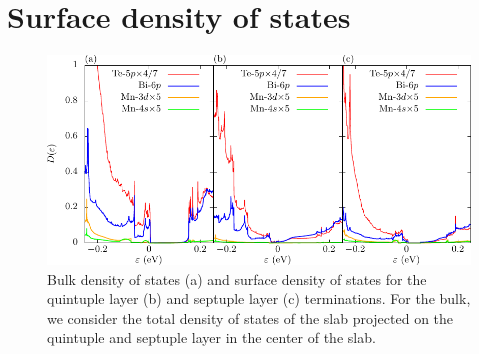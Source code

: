 \documentclass[showpacs, preprintnumbers, pra, superscriptaddress, floatfix, onecolumn, longbibliography]{revtex4-1}
\begin{document}
\section{Surface density of states}
\begin{figure}[h!]
 \centering
 \includegraphics[width=15 cm]{dos.pdf}
	\caption{ Bulk density of states (a) and surface density of states for the quintuple layer (b) and septuple layer (c) terminations. For the bulk, we consider the total density of states of the slab projected on the quintuple and septuple layer in the center of the slab. 	}
	\label{dft_sl}
\end{figure}
\end{document}
